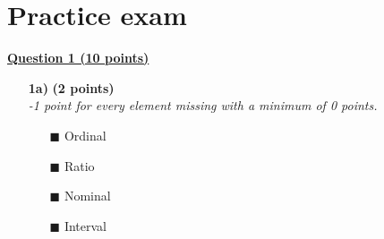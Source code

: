 
\section{Practice exam}

\selectfont 

\underline{\textbf{Question 1 (10 points)}} \\

\begin{itemize}
    \item[\textbf{1a)}] \textbf{(2 points)} \\ 
    \textit{-1 point for every element missing with a minimum of 0 points.}
        \begin{itemize}
        \item[$\blacksquare$] Ordinal        
        \item[$\blacksquare$] Ratio
        \item[$\blacksquare$] Nominal
        \item[$\blacksquare$] Interval 
        \end{itemize}
        

\end{itemize}
